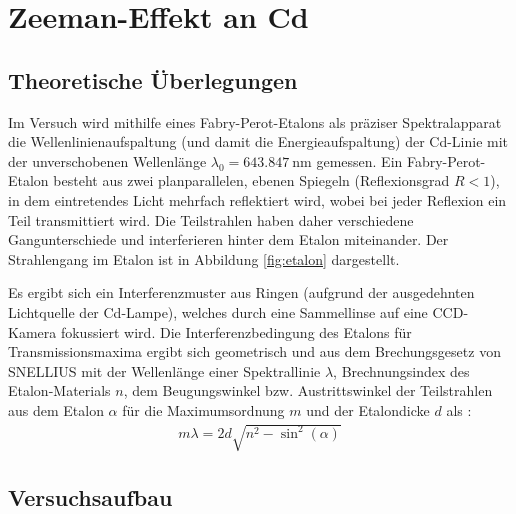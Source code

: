 \chapter{Zeeman-Effekt an Cd}

\section{Theoretische Überlegungen}


Im Versuch wird mithilfe eines Fabry-Perot-Etalons als präziser Spektralapparat die Wellenlinienaufspaltung (und damit die Energieaufspaltung) der Cd-Linie mit der unverschobenen Wellenlänge $\lambda_0=\SI{643.847}{\nano\meter}$ gemessen. Ein Fabry-Perot-Etalon besteht aus zwei planparallelen, ebenen Spiegeln (Reflexionsgrad $R<1$), in dem eintretendes Licht mehrfach reflektiert wird, wobei bei jeder Reflexion ein Teil transmittiert wird. Die Teilstrahlen haben daher verschiedene Gangunterschiede und interferieren hinter dem Etalon miteinander. Der Strahlengang im Etalon ist in Abbildung \ref{fig:etalon} dargestellt.


Es ergibt sich ein Interferenzmuster aus Ringen (aufgrund der ausgedehnten Lichtquelle der Cd-Lampe), welches durch eine Sammellinse auf eine CCD-Kamera fokussiert wird. Die Interferenzbedingung des Etalons für Transmissionsmaxima ergibt sich geometrisch und aus dem Brechungsgesetz von \uppercase{Snellius} mit der Wellenlänge einer Spektrallinie $\lambda$, Brechnungsindex des Etalon-Materials $n$, dem Beugungswinkel bzw. Austrittswinkel der Teilstrahlen aus dem Etalon $\alpha$ für die Maximumsordnung $m$ und der Etalondicke $d$ als \cite{LDzeeman}:
\begin{align} \label{eq:interferenz}
	m\lambda = 2d \sqrt{n^2-\sin^2(\alpha)}
\end{align}

\section{Versuchsaufbau}

